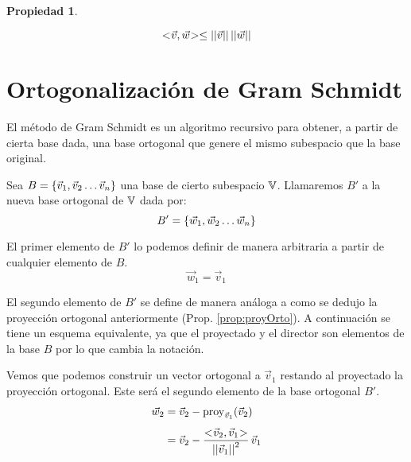 \documentclass[a5paper,12pt,twoside]{book}
\newtheorem{prop}{{Propiedad}}[chapter]
\begin{document}
\begin{mdframed}[style=MyFrame1]
    \begin{prop}
    \end{prop}
    \begin{equation*}
        <\hspace{-0.8mm}\Vec{v},\Vec{w}\hspace{-0.8mm}> \leq {\left|\left| {\Vec{v}} \right|\right|} \, {\left|\left| {\Vec{w}} \right|\right|}
    \end{equation*}
\end{mdframed}


\section{Ortogonalización de Gram Schmidt}

El método de Gram Schmidt es un algoritmo recursivo para obtener, a partir de cierta base dada, una base ortogonal que genere el mismo subespacio que la base original.

Sea $B={ \left\{ {\Vec{v}_1 , \Vec{v}_2 \dots \Vec{v}_n} \right\} }$ una base de cierto subespacio $\mathbb{V}$. Llamaremos $B'$ a la nueva base ortogonal de $\mathbb{V}$ dada por:
\begin{equation*}
    B' = { \left\{ {\Vec{w}_1 , \Vec{w}_2 \dots \Vec{w}_n} \right\} }
\end{equation*}

El primer elemento de $B'$ lo podemos definir de manera arbitraria a partir de cualquier elemento de $B$.
\begin{equation*}
    \Vec{w}_1 = \Vec{v}_1
\end{equation*}

El segundo elemento de $B'$ se define de manera análoga a como se dedujo la proyección ortogonal anteriormente (Prop. \ref{prop:proyOrto}). A continuación se tiene un esquema equivalente, ya que el proyectado y el director son elementos de la base $B$ por lo que cambia la notación.

\begin{center}
    \def\svgwidth{0.6\linewidth}
    
\end{center}

Vemos que podemos construir un vector ortogonal a $\Vec{v}_1$ restando al proyectado la proyección ortogonal. Este será el segundo elemento de la base ortogonal $B'$.
\begin{align*}
    \Vec{w}_2 &= \Vec{v}_2 - \operatorname{proy}_{\Vec{v}_1}(\Vec{v}_2)
    \\[1ex]
    &= \Vec{v}_2 - \frac{<\hspace{-0.8mm}\Vec{v}_2,\Vec{v}_1\hspace{-0.8mm}>}{{\left|\left| {\Vec{v}_1} \right|\right|}^2} \, \Vec{v}_1
\end{align*}
\end{document}
